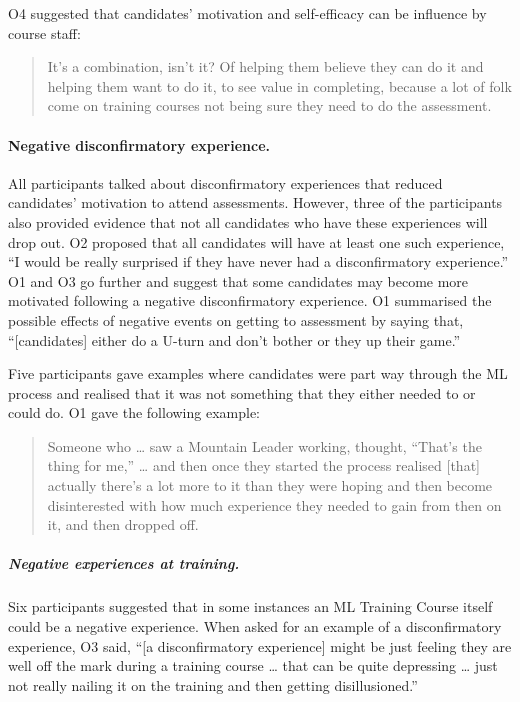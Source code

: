 \documentclass[a4paper,]{book}
\let\oldparagraph\paragraph
\renewcommand{\paragraph}[1]{\oldparagraph{#1}\mbox{}}
\let\oldsubparagraph\subparagraph
\renewcommand{\subparagraph}[1]{\oldsubparagraph{#1}\mbox{}}
\begin{document}
O4 suggested that candidates' motivation and self-efficacy can be influence by course staff:

\begin{quote}
It's a combination, isn't it? Of helping them believe they can do it and helping them want to do it, to see value in completing, because a lot of folk come on training courses not being sure they need to do the assessment.
\end{quote}

\hypertarget{negative-disconfirmatory-experience.}{%
\paragraph{Negative disconfirmatory experience.}\label{negative-disconfirmatory-experience.}}

All participants talked about disconfirmatory experiences that reduced candidates' motivation to attend assessments. However, three of the participants also provided evidence that not all candidates who have these experiences will drop out. O2 proposed that all candidates will have at least one such experience, ``I would be really surprised if they have never had a disconfirmatory experience.'' O1 and O3 go further and suggest that some candidates may become more motivated following a negative disconfirmatory experience. O1 summarised the possible effects of negative events on getting to assessment by saying that, ``{[}candidates{]} either do a U-turn and don't bother or they up their game.''

Five participants gave examples where candidates were part way through the ML process and realised that it was not something that they either needed to or could do. O1 gave the following example:

\begin{quote}
Someone who \ldots{} saw a Mountain Leader working, thought, ``That's the thing for me,'' \ldots{} and then once they started the process realised {[}that{]} actually there's a lot more to it than they were hoping and then become disinterested with how much experience they needed to gain from then on it, and then dropped off.
\end{quote}

\hypertarget{negative-experiences-at-training.}{%
\subparagraph{Negative experiences at training.}\label{negative-experiences-at-training.}}

Six participants suggested that in some instances an ML Training Course itself could be a negative experience. When asked for an example of a disconfirmatory experience, O3 said, ``{[}a disconfirmatory experience{]} might be just feeling they are well off the mark during a training course \ldots{} that can be quite depressing \ldots{} just not really nailing it on the training and then getting disillusioned.''
\end{document}
